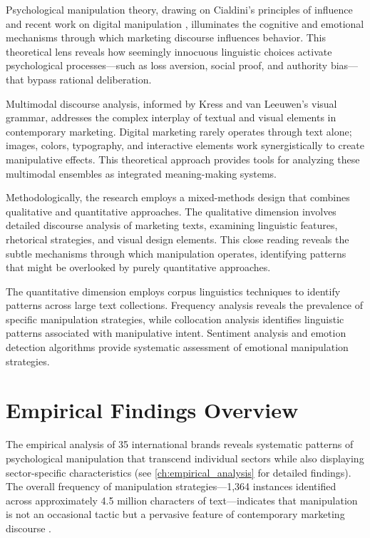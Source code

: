 Psychological manipulation theory, drawing on Cialdini's principles of influence \cite{cialdini2021influence} and recent work on digital manipulation \cite{calo2014digital}, illuminates the cognitive and emotional mechanisms through which marketing discourse influences behavior. This theoretical lens reveals how seemingly innocuous linguistic choices activate psychological processes—such as loss aversion, social proof, and authority bias—that bypass rational deliberation.

Multimodal discourse analysis, informed by Kress and van Leeuwen's visual grammar, addresses the complex interplay of textual and visual elements in contemporary marketing. Digital marketing rarely operates through text alone; images, colors, typography, and interactive elements work synergistically to create manipulative effects. This theoretical approach provides tools for analyzing these multimodal ensembles as integrated meaning-making systems.

Methodologically, the research employs a mixed-methods design that combines qualitative and quantitative approaches. The qualitative dimension involves detailed discourse analysis of marketing texts, examining linguistic features, rhetorical strategies, and visual design elements. This close reading reveals the subtle mechanisms through which manipulation operates, identifying patterns that might be overlooked by purely quantitative approaches.

The quantitative dimension employs corpus linguistics techniques to identify patterns across large text collections. Frequency analysis reveals the prevalence of specific manipulation strategies, while collocation analysis identifies linguistic patterns associated with manipulative intent. Sentiment analysis and emotion detection algorithms provide systematic assessment of emotional manipulation strategies.

\section{Empirical Findings Overview}
\label{sec:findings_overview}

The empirical analysis of 35 international brands reveals systematic patterns of psychological manipulation that transcend individual sectors while also displaying sector-specific characteristics (see \autoref{ch:empirical_analysis} for detailed findings). The overall frequency of manipulation strategies—1,364 instances identified across approximately 4.5 million characters of text—indicates that manipulation is not an occasional tactic but a pervasive feature of contemporary marketing discourse \cite{fairclough2015language}.

